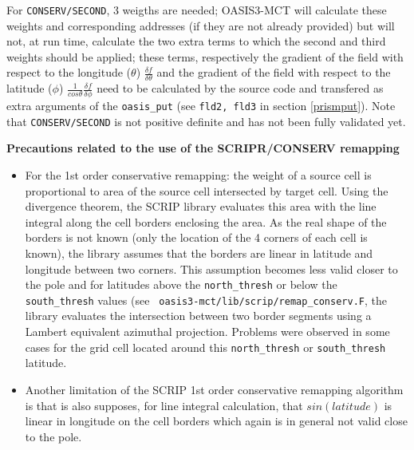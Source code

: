 \begin{itemize}
\begin{itemize}
\begin{itemize}
      For {\tt CONSERV/SECOND}, 3 weigths are needed; OASIS3-MCT will
      calculate these weights and corresponding addresses (if they are
      not already provided) but will not, at run time, calculate the
      two extra terms to which the second and third weights should be
      applied; these terms, respectively the gradient of the field
      with respect to the longitude ($\theta$) $\frac{\delta f}{\delta
        \theta}$ and the gradient of the field with respect to the
      latitude ($\phi$) $\frac{1}{cos \theta}\frac{\delta f}{\delta
        \phi}$ need to be calculated by the source code and transfered
      as extra arguments of the {\tt oasis\_put} (see {\tt fld2, fld3}
      in section \ref{prismput}).  Note that {\tt CONSERV/SECOND} is
      not positive definite and has not been fully validated yet.

    \end{itemize}

  \end{itemize}

  {\bf Precautions related to the use of the SCRIPR/CONSERV remapping}

  \begin{itemize}

  \item For the 1st order conservative remapping: the weight of a
    source cell is proportional to area of the source cell intersected
    by target cell.  Using the divergence theorem, the SCRIP library
    evaluates this area with the line integral along the cell borders
    enclosing the area. As the real shape of the borders is not known
    (only the location of the 4 corners of each cell is known), the
    library assumes that the borders are linear in latitude and
    longitude between two corners.  This assumption becomes less valid
    closer to the pole and for latitudes above the {\tt north\_thresh}
    or below the {\tt south\_thresh} values (see {\tt
      oasis3-mct/lib/scrip/remap\_conserv.F}, the library evaluates
    the intersection between two border segments using a Lambert
    equivalent azimuthal projection. Problems were observed in some
    cases for the grid cell located around this {\tt north\_thresh} or
    {\tt south\_thresh} latitude.

  \item Another limitation of the SCRIP 1st order conservative
    remapping algorithm is that is also supposes, for line integral
    calculation, that $sin(latitude)$ is linear in longitude on the
    cell borders which again is in general not valid close to the
    pole.


\end{itemize}
\end{itemize}

